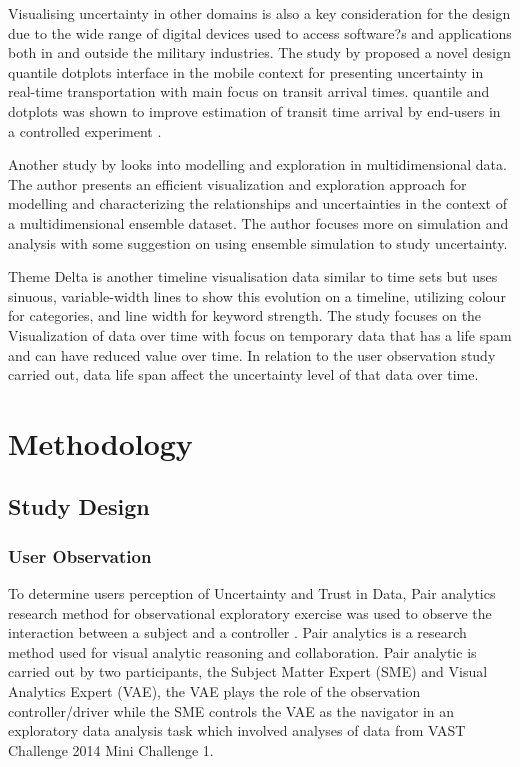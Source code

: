 \documentclass[journal]{vgtc}                %
\begin{document}
Visualising uncertainty in other domains is also a key consideration for the design due to the wide range of digital devices used to access software?s and applications both in and outside the military industries. The study by \cite{bus-uncertainty} proposed a novel design quantile dotplots interface in the mobile context for presenting uncertainty in real-time transportation with main focus on transit arrival times.  quantile and dotplots was shown to improve estimation of transit time arrival by end-users in a controlled experiment \cite{bus-uncertainty}. 

Another study by \cite{uncertainty-aware-multidimensional-data} looks into modelling and exploration in multidimensional data. The author presents an efficient visualization and exploration approach for modelling and characterizing the relationships and uncertainties in the context of a multidimensional ensemble dataset. The author focuses more on simulation and analysis with some suggestion on using ensemble simulation to study uncertainty.

Theme Delta \cite{themedelta} is another timeline visualisation data similar to time sets but uses sinuous, variable-width lines to show this evolution on a timeline, utilizing colour for categories, and line width for keyword strength.
The study focuses on the Visualization of data over time with focus on temporary data that has a life spam and can have reduced value over time. In relation to the user observation study carried out, data life span affect the uncertainty level of that data over time.

\section{Methodology}

\subsection{Study Design}
\subsubsection{User Observation}

To determine users perception of Uncertainty and Trust in Data, Pair analytics research method for observational exploratory exercise was used to observe the interaction between a subject and a controller  \cite{pair-analytics} . Pair analytics is a research method used for visual analytic reasoning and collaboration. Pair analytic is carried out by two participants, the Subject Matter Expert (SME) and Visual Analytics Expert (VAE), the VAE plays the role of the observation controller/driver while the SME controls the VAE as the navigator in an exploratory data analysis task which involved analyses of data from VAST Challenge 2014 Mini Challenge 1.
\end{document}
